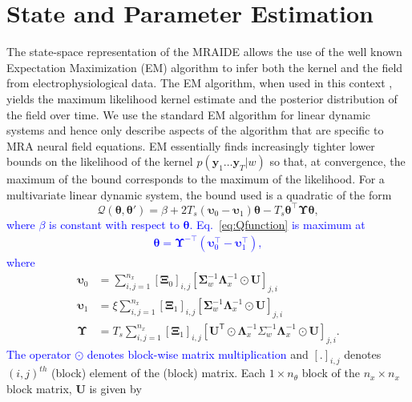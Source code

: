 \documentclass[journal,a4paper]{IEEEtran}
\newcommand{\parham}[1]{\textcolor{blue}{#1}}
\begin{document}
\section{State and Parameter Estimation}
The state-space representation of the MRAIDE allows the use of the well known Expectation Maximization (EM) algorithm \cite{Dempster1977} to infer both the kernel and the field from electrophysiological data. The EM algorithm, when used in this context \cite{Dewar2009}, yields the maximum likelihood kernel estimate and the posterior distribution of the field over time. We use the standard EM algorithm for linear dynamic systems \cite{Roweis1999,Shumway2000} and hence only describe aspects of the algorithm that are specific to MRA neural field equations. EM essentially finds increasingly tighter lower bounds on the likelihood of the kernel $p(\mathbf{y}_1 \ldots \mathbf{y}_T|w)$ so that, at convergence, the maximum of the bound corresponds to the maximum of the likelihood. For a multivariate linear dynamic system, the bound used is a quadratic of the form
\begin{equation}\label{eq:Qfunction}
 \mathcal Q\left(\boldsymbol \theta,\boldsymbol\theta'\right)=\beta+2T_s\left(\boldsymbol\upsilon_0-\boldsymbol\upsilon_1\right)\boldsymbol\theta-T_s\boldsymbol\theta^\top\boldsymbol\Upsilon\boldsymbol\theta,
\end{equation}
\parham{where $\beta$ is constant with respect to $\boldsymbol\theta$. Eq.~\ref{eq:Qfunction} is maximum at
\begin{align}
 \boldsymbol \theta= \boldsymbol\Upsilon^{-\top}(\boldsymbol\upsilon_0^\top-\boldsymbol\upsilon_1^\top),
\end{align}
where }
\begin{align}\label{eq:upsilon0}
 \boldsymbol\upsilon_0 & =\sum_{i,j=1}^{n_x}[\boldsymbol\Xi_0]_{i,j}[\boldsymbol\Sigma_{w}^{-1}\boldsymbol\Lambda_{x}^{-1}\odot\mathbf U]_{j,i}\\ 
 \boldsymbol\upsilon_1 & =\xi\sum_{i,j=1}^{n_x}[\boldsymbol\Xi_1]_{i,j}[\boldsymbol\Sigma_{w}^{-1}\boldsymbol\Lambda_{x}^{-1}\odot\mathbf U]_{j,i}\label{eq:upsilon1} \\
 \boldsymbol\Upsilon&=T_s\sum_{i,j=1}^{n_x}[\boldsymbol\Xi_1]_{i,j}[\mathbf{U}^{\mathsf T}\odot \boldsymbol\Lambda_{x}^{-1}\Sigma_{w}^{-1}\boldsymbol\Lambda_{x}^{-1}\odot\mathbf{U}]_{j,i}\label{eq:Upsilon}.
\end{align}
\parham{The operator $\odot$ denotes block-wise matrix multiplication} and  $[.]_{i,j}$ denotes $\left(i,j\right)^{th}$ (block) element of the (block) matrix. Each $1\times n_{\theta}$ block of the $n_x \times n_x$ block matrix,  $\mathbf U$ is given by
\end{document}
